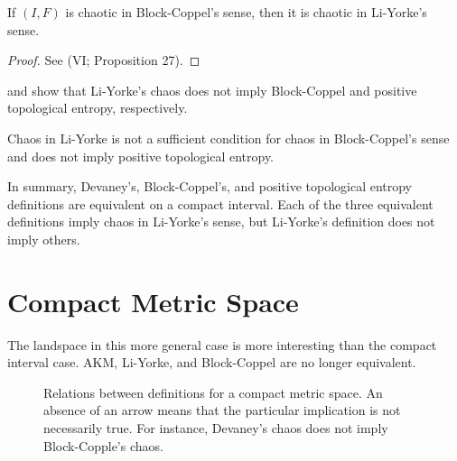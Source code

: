 \documentclass[12pt,twoside,draft]{book}
\begin{document}
\begin{theorem}
  \citep{blockcoppel}
  If $(I,F)$ is chaotic in Block-Coppel's sense, then it is chaotic in Li-Yorke's sense.
  \label{thm:devaney-liyorke}
  \begin{proof}
    See \citet{blockcoppel} (VI; Proposition 27).
  \end{proof}
\end{theorem}

\citet{aulbach} and \citet{smital} show that Li-Yorke's chaos does not imply Block-Coppel and positive topological entropy, respectively.
\begin{theorem}
  \citep{aulbach, smital}
  Chaos in Li-Yorke is not a sufficient condition for chaos in Block-Coppel's sense and does not imply positive topological entropy.
  \label{thm:counterexample1}
\end{theorem}

In summary, Devaney's, Block-Coppel's, and positive topological entropy definitions are equivalent on a compact interval.
Each of the three equivalent definitions imply chaos in Li-Yorke's sense, but Li-Yorke's definition does not imply others.


\section{Compact Metric Space}
The landspace in this more general case is more interesting than the compact interval case.
AKM, Li-Yorke, and Block-Coppel are no longer equivalent.
\begin{figure}[ht]
  \label{fig:chaos-metric}
  \caption{
    Relations between definitions for a compact metric space.
    An absence of an arrow means that the particular implication is not necessarily true.
    For instance, Devaney's chaos does not imply Block-Copple's chaos.
  }
\end{figure}
\end{document}
